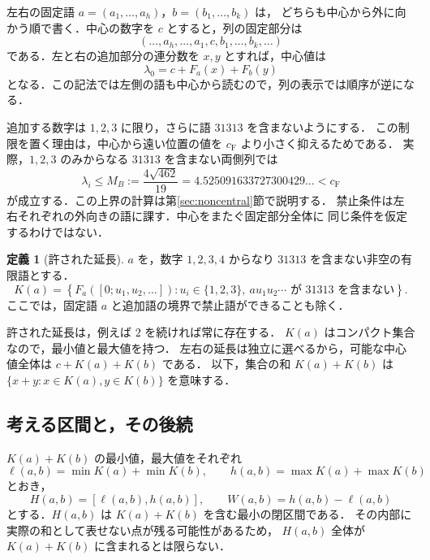 \documentclass[11pt,a4paper]{article}
\theoremstyle{definition}
\newtheorem{definition}{定義}
\newcommand{\CF}{c_{\mathrm F}}
\begin{document}
左右の固定語 $a=(a_1,\ldots,a_h)$，$b=(b_1,\ldots,b_k)$ は，
どちらも中心から外に向かう順で書く．中心の数字を $c$ とすると，列の固定部分は
\[
 (\ldots,a_h,\ldots,a_1,\boxed{c},b_1,\ldots,b_k,\ldots)
\]
である．左と右の追加部分の連分数を $x,y$ とすれば，中心値は
\[
 \lambda_0=c+F_a(x)+F_b(y)
\]
となる．この記法では左側の語も中心から読むので，列の表示では順序が逆になる．

追加する数字は $1,2,3$ に限り，さらに語 $31313$ を含まないようにする．
この制限を置く理由は，中心から遠い位置の値を $\CF$ より小さく抑えるためである．
実際，$1,2,3$ のみからなる $31313$ を含まない両側列では
\begin{equation}\label{eq:bulk}
 \lambda_i\le M_B:=\frac{4\sqrt{462}}{19}
       =4.525091633727300429\ldots<\CF
\end{equation}
が成立する．この上界の計算は第\ref{sec:noncentral}節で説明する．
禁止条件は左右それぞれの外向きの語に課す．中心をまたぐ固定部分全体に
同じ条件を仮定するわけではない．

\begin{definition}[許された延長]\label{def:K}
$a$ を，数字 $1,2,3,4$ からなり $31313$ を含まない非空の有限語とする．
\[
 K(a)=\left\{F_a([0;u_1,u_2,\ldots]):
  u_i\in\{1,2,3\},\
  au_1u_2\cdots\text{ が }31313\text{ を含まない}\right\}.
\]
ここでは，固定語 $a$ と追加語の境界で禁止語ができることも除く．
\end{definition}
許された延長は，例えば $2$ を続ければ常に存在する．
$K(a)$ はコンパクト集合なので，最小値と最大値を持つ．
左右の延長は独立に選べるから，可能な中心値全体は $c+K(a)+K(b)$ である．
以下，集合の和 $K(a)+K(b)$ は $\{x+y:x\in K(a),y\in K(b)\}$ を意味する．

\subsection{考える区間と，その後続}
$K(a)+K(b)$ の最小値，最大値をそれぞれ
\[
 \ell(a,b)=\min K(a)+\min K(b),\qquad
 h(a,b)=\max K(a)+\max K(b)
\]
とおき，
\[
 H(a,b)=[\ell(a,b),h(a,b)],\qquad W(a,b)=h(a,b)-\ell(a,b)
\]
とする．$H(a,b)$ は $K(a)+K(b)$ を含む最小の閉区間である．
その内部に実際の和として表せない点が残る可能性があるため，
$H(a,b)$ 全体が $K(a)+K(b)$ に含まれるとは限らない．
\end{document}
